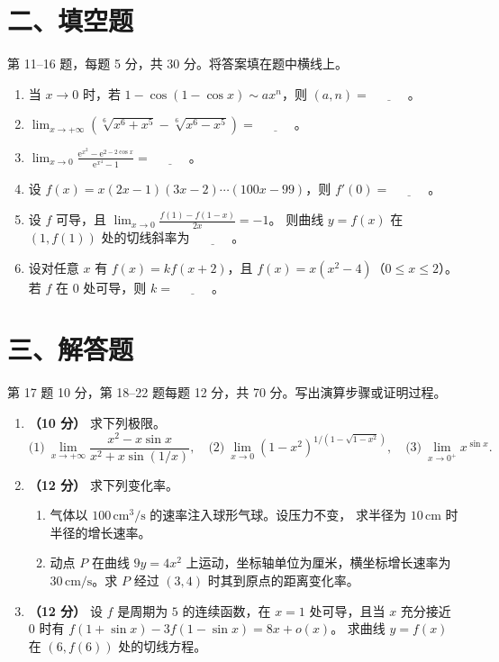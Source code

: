 \documentclass[UTF8,a4paper,zihao=-4,fontset=fandol]{ctexart}
\newcommand{\blank}{\underline{\hspace{3em}}}
\newcommand{\fillsection}{%
  \section*{二、填空题}
  第 11--16 题，每题 5 分，共 30 分。将答案填在题中横线上。}
\newcommand{\solvesection}{%
  \newpage
  \section*{三、解答题}
  第 17 题 10 分，第 18--22 题每题 12 分，共 70 分。写出演算步骤或证明过程。}
\begin{document}
\fillsection
\begin{enumerate}[start=11]
\item 当 $x\to0$ 时，若 $1-\cos(1-\cos x)\sim ax^n$，则 $(a,n)=\blank$。
\item $\displaystyle\lim_{x\to+\infty}\left(\sqrt[6]{x^6+x^5}-\sqrt[6]{x^6-x^5}\right)=\blank$。
\item $\displaystyle\lim_{x\to0}\frac{\mathrm{e}^{x^2}-\mathrm{e}^{2-2\cos x}}{\mathrm{e}^{x^4}-1}=\blank$。
\item 设 $f(x)=x(2x-1)(3x-2)\cdots(100x-99)$，则 $f'(0)=\blank$。
\item 设 $f$ 可导，且 $\displaystyle\lim_{x\to0}\frac{f(1)-f(1-x)}{2x}=-1$。
则曲线 $y=f(x)$ 在 $(1,f(1))$ 处的切线斜率为 $\blank$。
\item 设对任意 $x$ 有 $f(x)=kf(x+2)$，且 $f(x)=x(x^2-4)$（$0\le x\le2$）。
若 $f$ 在 $0$ 处可导，则 $k=\blank$。
\end{enumerate}
\solvesection
\begin{enumerate}[start=17]
\item \textbf{（10 分）} 求下列极限。
\[
 \text{(1)}\ \lim_{x\to+\infty}\frac{x^2-x\sin x}{x^2+x\sin(1/x)},
 \quad
 \text{(2)}\ \lim_{x\to0}(1-x^2)^{1/(1-\sqrt{1-x^2})},
 \quad
 \text{(3)}\ \lim_{x\to0^+}x^{\sin x}.
\]
\vspace{4.5cm}
\item \textbf{（12 分）} 求下列变化率。
\begin{enumerate}[label=(\arabic*),nosep]
\item 气体以 $100\,\mathrm{cm}^3/\mathrm{s}$ 的速率注入球形气球。设压力不变，
求半径为 $10\,\mathrm{cm}$ 时半径的增长速率。
\item 动点 $P$ 在曲线 $9y=4x^2$ 上运动，坐标轴单位为厘米，横坐标增长速率为
$30\,\mathrm{cm}/\mathrm{s}$。求 $P$ 经过 $(3,4)$ 时其到原点的距离变化率。
\end{enumerate}
\vspace{4.5cm}
\item \textbf{（12 分）} 设 $f$ 是周期为 $5$ 的连续函数，在 $x=1$ 处可导，且当 $x$ 充分接近 $0$ 时有
$f(1+\sin x)-3f(1-\sin x)=8x+o(x)$。
求曲线 $y=f(x)$ 在 $(6,f(6))$ 处的切线方程。
\end{enumerate}
\newpage
\end{document}
